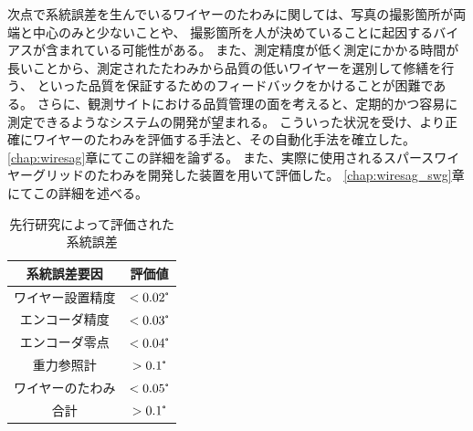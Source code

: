 \documentclass[../../main.tex]{subfiles}
\begin{document}
次点で系統誤差を生んでいるワイヤーのたわみに関しては、写真の撮影箇所が両端と中心のみと少ないことや、
撮影箇所を人が決めていることに起因するバイアスが含まれている可能性がある。
また、測定精度が低く測定にかかる時間が長いことから、測定されたたわみから品質の低いワイヤーを選別して修繕を行う、
といった品質を保証するためのフィードバックをかけることが困難である。
さらに、観測サイトにおける品質管理の面を考えると、定期的かつ容易に測定できるようなシステムの開発が望まれる。
こういった状況を受け、より正確にワイヤーのたわみを評価する手法と、その自動化手法を確立した。
\ref{chap:wiresag}章にてこの詳細を論ずる。
また、実際に使用されるスパースワイヤーグリッドのたわみを開発した装置を用いて評価した。
\ref{chap:wiresag_swg}章にてこの詳細を述べる。
\begin{table}[H]
    \centering
    \caption{先行研究によって評価された系統誤差}
    \begin{tabular}{|c|c|}
        \hline
        系統誤差要因 & 評価値 \\
        \hline
        ワイヤー設置精度 & $< 0.02\tcdegree$ \\
        エンコーダ精度 & $<0.03\tcdegree$ \\
        エンコーダ零点 & $<0.04\tcdegree$ \\
        重力参照計 & $>0.1\tcdegree$ \\
        ワイヤーのたわみ & $<0.05\tcdegree$ \\
        \hline
        合計 & $>0.1\tcdegree$ \\
        \hline
    \end{tabular}
    \label{tab:systematic_errors_old}
\end{table}
\end{document}
